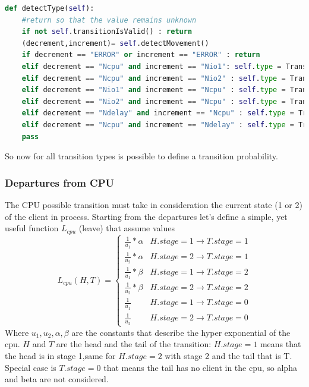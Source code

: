 \documentclass[12pt,a4paper]{article}
\begin{document}
\begin{lstlisting}[language=python]
    def detectType(self):
    #return so that the value remains unknown
    if not self.transitionIsValid() : return
    (decrement,increment)= self.detectMovement()
    if decrement == "ERROR" or increment == "ERROR" : return 
    elif decrement == "Ncpu" and increment == "Nio1": self.type = Transition.TransitionType.CPU_TO_IO1
    elif decrement == "Ncpu" and increment == "Nio2" : self.type = Transition.TransitionType.CPU_TO_IO2
    elif decrement == "Nio1" and increment == "Ncpu" : self.type = Transition.TransitionType.IO1_TO_CPU
    elif decrement == "Nio2" and increment == "Ncpu" : self.type = Transition.TransitionType.IO2_TO_CPU
    elif decrement == "Ndelay" and increment == "Ncpu" : self.type = Transition.TransitionType.DELAY_TO_CPU
    elif decrement == "Ncpu" and increment == "Ndelay" : self.type = Transition.TransitionType.CPU_TO_DELAY
    pass
\end{lstlisting}

So now for all transition types is possible to define a transition probability. \pagebreak

\subsubsection{Departures from CPU}

The CPU possible transition must take in consideration the current state (1 or 2) of the client in process. Starting from the departures let's define a simple, yet useful function $L_{cpu}$ (leave) that assume values 
$$L_{cpu}(H,T)=
\begin{cases}
    \frac{1}{u_1}*\alpha &  H.stage=1 \rightarrow T.stage=1 \\
    \frac{1}{u_2}*\alpha & H.stage=2 \rightarrow T.stage=1\\
    \frac{1}{u_1}*\beta & H.stage=1 \rightarrow T.stage=2 \\
    \frac{1}{u_2}*\beta & H.stage=2 \rightarrow T.stage=2\\
    \frac{1}{u_1} & H.stage=1 \rightarrow T.stage=0\\
    \frac{1}{u_2} & H.stage=2 \rightarrow T.stage=0
\end{cases}
$$
Where $u_1,u_2,\alpha,\beta$ are the constants that describe the hyper exponential of the cpu. $H$ and $T$ are the head and the tail of the transition: $H.stage=1$ means that the head is in stage 1,same for $H.stage=2$ with stage 2 and the tail that is T. Special case is $T.stage=0$ that means the tail has no client in the cpu, so alpha and beta are not considered.  
\end{document}
